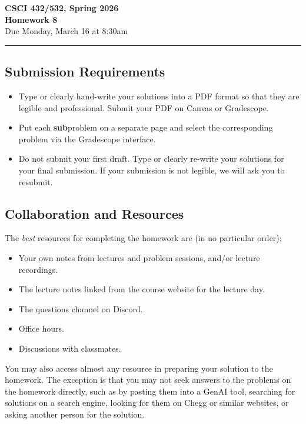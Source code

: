 \documentclass[11pt]{article}
\begin{document}
\begin{center}
\Large\textbf{CSCI 432/532, Spring 2026}%
\\
\LARGE\textbf{Homework 8}%
\\[0.5ex]
\large Due Monday, March 16 at 8:30am
\end{center}

\bigskip
\hrule
\bigskip

\subsection*{Submission Requirements}
\begin{itemize}
    \item Type or clearly hand-write your solutions into a PDF format so that they are legible and professional. Submit your PDF on Canvas or Gradescope. 
	\item Put each \textbf{sub}problem on a separate page and select the corresponding problem via the Gradescope interface.
    \item Do not submit your first draft. Type or clearly re-write your solutions for your final submission. If your submission is not legible, we will ask you to resubmit.
\end{itemize}

\subsection*{Collaboration and Resources}

The \emph{best} resources for completing the homework are (in no particular order):
\begin{itemize}
	\item Your own notes from lectures and problem sessions, and/or lecture recordings.
	\item The lecture notes linked from the course website for the lecture day.
	\item The questions channel on Discord.
	\item Office hours.
	\item Discussions with classmates.
\end{itemize}
You may also access almost any resource in preparing your solution to the
homework. The exception is that you may not seek answers to the problems on the
homework directly, such as by pasting them into a GenAI tool, searching for
solutions on a search engine, looking for them on Chegg or similar websites, or
asking another person for the solution.
\end{document}

